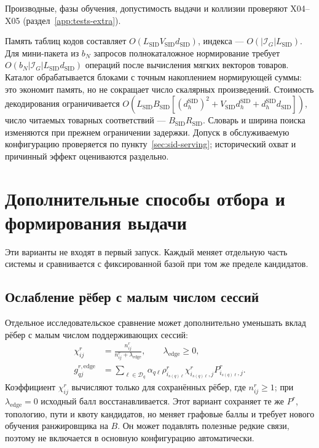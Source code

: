 \documentclass[12pt,a4paper]{article}
\theoremstyle{plainru}
\begin{document}
Производные, фазы обучения, допустимость выдачи и коллизии проверяют
X04--X05 (раздел~\ref{app:tests-extra}).

Память таблиц кодов составляет
$O(L_{\mathrm{SID}}V_{\mathrm{SID}}d_{\mathrm{SID}})$,
индекса --- $O(|\mathcal I_G|L_{\mathrm{SID}})$.
Для мини-пакета из $b_N$ запросов полнокаталожное нормирование требует
$O(b_N|\mathcal I_G|L_{\mathrm{SID}}d_{\mathrm{SID}})$ операций
после вычисления мягких векторов товаров. Каталог обрабатывается
блоками с точным накоплением нормирующей суммы: это экономит память,
но не сокращает число скалярных произведений.
Стоимость декодирования ограничивается
$O(L_{\mathrm{SID}}B_{\mathrm{SID}}
[(d_h^{\mathrm{SID}})^2+V_{\mathrm{SID}}d_h^{\mathrm{SID}}
+d_h^{\mathrm{SID}}d_{\mathrm{SID}}])$,
число читаемых товарных соответствий ---
$B_{\mathrm{SID}}R_{\mathrm{SID}}$.
Словарь и ширина поиска изменяются при прежнем ограничении задержки.
Допуск в обслуживаемую конфигурацию проверяется по пункту~\ref{sec:sid-serving};
исторический охват и причинный эффект оцениваются раздельно.

\section{Дополнительные способы отбора и формирования выдачи}\label{sec:model-extensions}

Эти варианты не входят в первый запуск. Каждый меняет отдельную часть
системы и сравнивается с фиксированной базой при том же пределе кандидатов.

\subsection{Ослабление рёбер с малым числом сессий}\label{sec:model-edge-optional}

Отдельное исследовательское сравнение может дополнительно уменьшать
вклад рёбер с малым числом поддерживающих сессий:
\begin{align}\label{eq:model-edge-ablation}
\chi^r_{ij}&=\frac{n^r_{ij}}{n^r_{ij}+\lambda_{\mathrm{edge}}},
\qquad \lambda_{\mathrm{edge}}\ge0,\nonumber\\
g^{r,\mathrm{edge}}_{qj}
&=\sum_{\ell\in\mathcal D_q}\alpha_{q\ell}
\rho^r_{i_{s(q)\ell}}\chi^r_{i_{s(q)\ell},j}
P^r_{i_{s(q)\ell},j}.
\end{align}
Коэффициент $\chi^r_{ij}$ вычисляют только для сохранённых рёбер,
где $n^r_{ij}\ge1$; при $\lambda_{\mathrm{edge}}=0$ исходный балл
восстанавливается. Этот вариант сохраняет те же $P^r$, топологию,
пути и квоту кандидатов, но меняет графовые баллы и требует нового
обучения ранжировщика на $B$. Он может подавлять полезные редкие
связи, поэтому не включается в основную конфигурацию автоматически.
\end{document}

